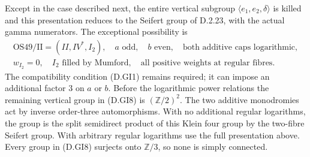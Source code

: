 Except in the case described next, the entire vertical
subgroup $\langle e_1,e_2,\delta\rangle$ is killed and this
presentation reduces to the Seifert group of D.2.23, with
the actual gamma numerators. The exceptional possibility is
\[
\begin{gathered}
 \mathrm{OS49/II}=(II,IV^*,I_2),\quad a\text{ odd},\quad
 b\text{ even},\quad\text{both additive caps logarithmic},\\
 w_{I_2}=0,\quad I_2\text{ filled by Mumford},\quad
 \text{all positive weights at regular fibres}.
\end{gathered}                                             \tag{D.GI8}
\]
The compatibility condition (D.GI1) remains required; it
can impose an additional factor $3$ on $a$ or $b$.
Before the logarithmic power relations the remaining
vertical group in (D.GI8) is $(\mathbb Z/2)^2$. The two
additive monodromies act by inverse order-three
automorphisms. With no additional regular logarithms,
the group is the split semidirect product of this Klein
four group by the two-fibre Seifert group. With arbitrary
regular logarithms use the full presentation above.
Every group in (D.GI8) surjects onto $\mathbb Z/3$, so none
is simply connected.


